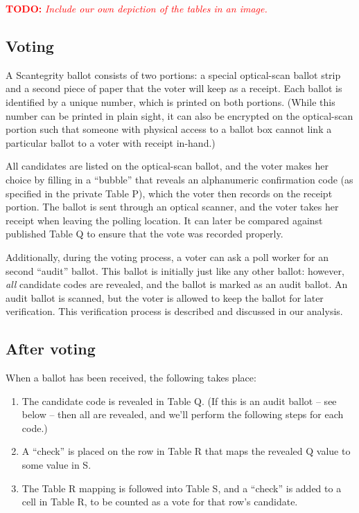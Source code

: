 \documentclass[10pt,twocolumn]{article}
\newcommand{\todo}[1]{\textcolor{red}{\textbf{TODO:} \emph{#1}}}
\begin{document}
\todo{Include our own depiction of the tables in an image.}

\subsection{Voting}

A Scantegrity ballot consists of two portions: a special optical-scan ballot strip and a second
piece of paper that the voter will keep as a receipt. Each ballot is identified by a unique number,
which is printed on both portions. (While this number can be printed in plain sight, it can also be
encrypted on the optical-scan portion such that someone with physical access to a ballot box cannot
link a particular ballot to a voter with receipt in-hand.)

All candidates are listed on the optical-scan ballot, and the voter makes her choice by filling
in a ``bubble'' that reveals an alphanumeric confirmation code (as specified in the private Table
P), which the voter then records on the receipt portion. The ballot is sent through an optical
scanner, and the voter takes her receipt when leaving the polling location. It can later be
compared against published Table Q to ensure that the vote was recorded properly.

Additionally, during the voting process, a voter can ask a poll worker for an second ``audit''
ballot. This ballot is initially just like any other ballot: however, \emph{all} candidate codes are
revealed, and the ballot is marked as an audit ballot. An audit ballot is scanned, but the voter is
allowed to keep the ballot for later verification. This verification process is described and
discussed in our analysis.

\subsection{After voting}

When a ballot has been received, the following takes place:
\begin{enumerate}
	\item
		The candidate code is revealed in Table Q. (If this is an audit ballot -- see below -- then all
		are revealed, and we'll perform the following steps for each code.)
	\item
		A ``check'' is placed on the row in Table R that maps the revealed Q value to some value in S.
	\item
		The Table R mapping is followed into Table S, and a ``check'' is added to a cell in Table R,
		to be counted as a vote for that row's candidate.
\end{enumerate}
\end{document}
